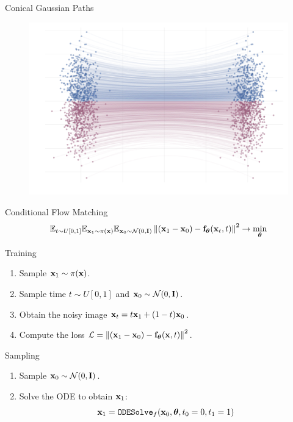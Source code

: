 \documentclass{beamer}
\begin{document}
\begin{frame}{Conical Gaussian Paths}
\begin{minipage}[t]{0.5\columnwidth}
		\end{minipage}%
		\begin{minipage}[t]{0.5\columnwidth}
			\begin{figure}
				\centering
				\includegraphics[width=\linewidth]{figs/g2g-forward_samples}
			\end{figure}
	\end{minipage}
\end{frame}
\begin{frame}{Conditional Flow Matching}
	\vspace{-0.3cm}
	\[
	 \mathbb{E}_{t \sim U[0, 1]} \mathbb{E}_{\mathbf{x}_1 \sim \pi(\mathbf{x})} \mathbb{E}_{\mathbf{x}_0 \sim \mathcal{N}(0, \mathbf{I})}\left\| (\mathbf{x}_1 - \mathbf{x}_0) - \mathbf{f}_{\boldsymbol{\theta}}(\mathbf{x}_t, t) \right\|^2  \rightarrow \min_{\boldsymbol{\theta}}
	\]
	\begin{block}{Training}
		\begin{enumerate}
			\item Sample $\mathbf{x}_1 \sim \pi(\mathbf{x})$.
			\item Sample time $t \sim U[0, 1]$ and $\mathbf{x}_0 \sim \mathcal{N}(0, \mathbf{I})$.
			\item Obtain the noisy image $\mathbf{x}_t = t \mathbf{x}_1 + (1 - t) \mathbf{x}_0$.
			\item Compute the loss $ \mathcal{L} = \left\| (\mathbf{x}_1 - \mathbf{x}_0) - \mathbf{f}_{\boldsymbol{\theta}}(\mathbf{x}, t) \right\|^2 $.
		\end{enumerate}
	\end{block}
	\eqpause
	\vspace{-0.3cm}
	\begin{block}{Sampling}
		\begin{enumerate}
			\item Sample $\mathbf{x}_0 \sim \mathcal{N}(0, \mathbf{I})$.
			\item Solve the ODE to obtain $\mathbf{x}_1$:
			\[
				\mathbf{x}_1 = \texttt{ODESolve}_f(\mathbf{x}_0, \boldsymbol{\theta}, t_0=0, t_1=1)
			\]
		\end{enumerate}
	\end{block}
\end{frame}
\end{document}
